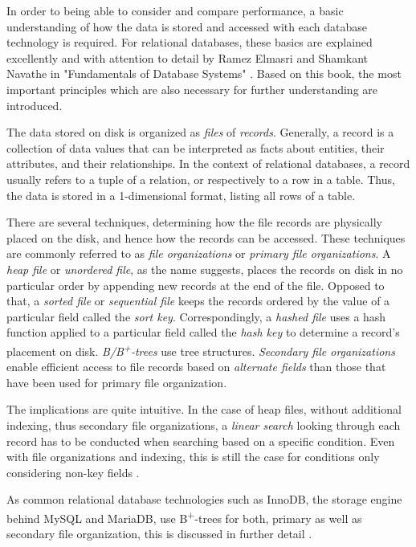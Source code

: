In order to being able to consider and compare performance, a basic understanding of how the data is stored and accessed with each database technology is required. For relational databases, these basics are explained excellently and with attention to detail by Ramez Elmasri and Shamkant Navathe in "Fundamentals of Database Systems" \cite{DatabaseFundamentals}. Based on this book, the most important principles which are also necessary for further understanding are introduced.\par
The data stored on disk is organized as \emph{files} of \emph{records}. Generally, a record is a collection of data values that can be interpreted as facts about entities, their attributes, and their relationships. In the context of relational databases, a record usually refers to a tuple of a relation, or respectively to a row in a table. Thus, the data is stored in a 1-dimensional format, listing all rows of a table.\par
There are several techniques, determining how the file records are physically placed on the disk, and hence how the records can be accessed. These techniques are commonly referred to as \emph{file organizations} or \emph{primary file organizations}. A \emph{heap file} or \emph{unordered file}, as the name suggests, places the records on disk in no particular order by appending new records at the end of the file. Opposed to that, a \emph{sorted file} or \emph{sequential file} keeps the records ordered by the value of a particular field called the \emph{sort key}. Correspondingly, a \emph{hashed file} uses a hash function applied to a particular field called the \emph{hash key} to determine a record's placement on disk. \emph{B/B\textsuperscript{+}-trees} use tree structures. \emph{Secondary file organizations} enable efficient access to file records based on \emph{alternate fields} than those that have been used for primary file organization.\par
The implications are quite intuitive. In the case of heap files, without additional indexing, thus secondary file organizations, a \emph{linear search} looking through each record has to be conducted when searching based on a specific condition. Even with file organizations and indexing, this is still the case for conditions only considering non-key fields \cite{DatabaseFundamentals}.\par 
As common relational database technologies such as InnoDB, the storage engine behind MySQL and MariaDB, use B\textsuperscript{+}-trees for both, primary as well as secondary file organization, this is discussed in further detail \cite{InnoDB}.

